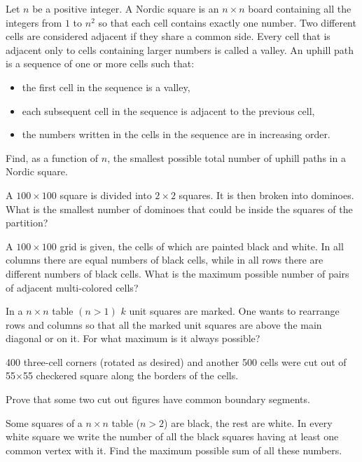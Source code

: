 \begin{problem}[ISL 2022]
    Let $n$ be a positive integer. A Nordic square is an $n \times n$ board containing all the integers from $1$ to $n^2$ so that each cell contains exactly one number. Two different cells are considered adjacent if they share a common side. Every cell that is adjacent only to cells containing larger numbers is called a valley. An uphill path is a sequence of one or more cells such that:
    \begin{itemize}
        \item the first cell in the sequence is a valley,
        \item each subsequent cell in the sequence is adjacent to the previous cell,
        \item the numbers written in the cells in the sequence are in increasing order.
    \end{itemize}
    Find, as a function of $n$, the smallest possible total number of uphill paths in a Nordic square.
\end{problem}

\begin{problem}
    A $100\times 100$ square is divided into $2\times 2$ squares. It is then broken into dominoes. What is the smallest number of dominoes that could be inside the squares of the partition?
\end{problem}

\begin{problem}
    A $100\times 100$ grid is given, the cells of which are painted black and white. In all columns there are equal numbers of black cells, while in all rows there are different numbers of black cells. What is the maximum possible number of pairs of adjacent multi-colored cells?
\end{problem}

\begin{problem}[Tuymaada 2021]
    In a $n\times n$ table $(n>1)$ $k$ unit squares are marked. One wants to rearrange rows and columns so that all the marked unit squares are above the main diagonal or on it. For what maximum  is it always possible?
\end{problem}

\begin{problem}
    400 three-cell corners (rotated as desired) and another 500 cells were cut out of 55×55 checkered square along the borders of the cells.
    
    Prove that some two cut out figures have common boundary segments.
\end{problem}

\begin{problem}[IZhO 2020]
    Some squares of a $n \times n$ table ($n>2$) are black, the rest are white. In every white square we write the number of all the black squares having at least one common vertex with it. Find the maximum possible sum of all these numbers.
\end{problem}
